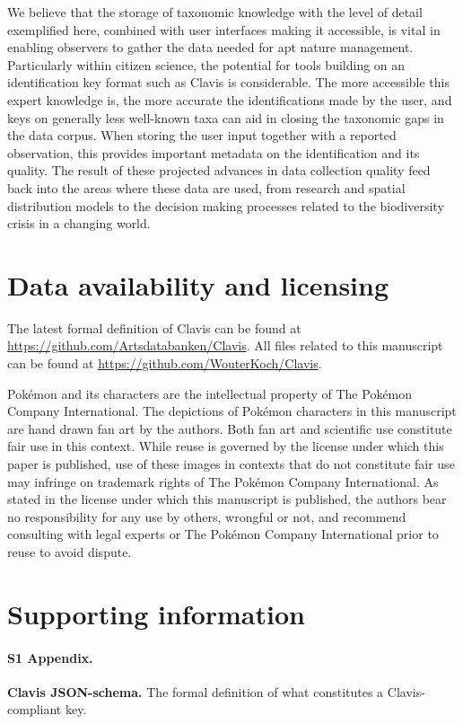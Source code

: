 \documentclass[10pt,letterpaper]{article}
\begin{document}
We believe that the storage of taxonomic knowledge with the level of detail exemplified here, combined with user interfaces making it accessible, is vital in enabling observers to gather the data needed for apt nature management. Particularly within citizen science, the potential for tools building on an identification key format such as Clavis is considerable. The more accessible this expert knowledge is, the more accurate the identifications made by the user, and keys on generally less well-known taxa can aid in closing the taxonomic gaps in the data corpus. When storing the user input together with a reported observation, this provides important metadata on the identification and its quality. The result of these projected advances in data collection quality feed back into the areas where these data are used, from research and spatial distribution models to the decision making processes related to the biodiversity crisis in a changing world.

\section*{
Data availability and licensing
}
The latest formal definition of Clavis can be found at \url{https://github.com/Artsdatabanken/Clavis}. All files related to this manuscript can be found at \url{https://github.com/WouterKoch/Clavis}.

Pokémon and its characters are the intellectual property of The Pokémon Company International. The depictions of Pokémon characters in this manuscript are hand drawn fan art by the authors. Both fan art and scientific use constitute fair use in this context. While reuse is governed by the license under which this paper is published, use of these images in contexts that do not constitute fair use may infringe on trademark rights of The Pokémon Company International. As stated in the license under which this manuscript is published, the authors bear no responsibility for any use by others, wrongful or not, and recommend consulting with legal experts or The Pokémon Company International prior to reuse to avoid dispute.

\section*{
Supporting information
}

\paragraph*{S1 Appendix.}
\label{S1_Appendix}
{\bf Clavis JSON-schema.} The formal definition of what constitutes a Clavis-compliant key.
\end{document}

